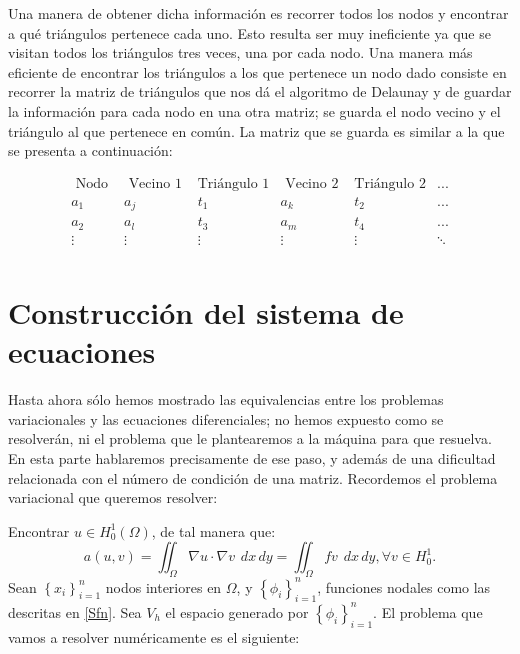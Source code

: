 \documentclass[12pt,spanish,oneside]{book}
\theoremstyle{plain}
\numberwithin{equation}{chapter}
\theoremstyle{definition}
\theoremstyle{remark}
\newcommand{\dxy}{\hspace{5pt} dx\hspace{2pt} dy }
\begin{document}
Una manera de obtener dicha información es recorrer todos los nodos y encontrar a qué triángulos pertenece cada uno. Esto resulta ser muy ineficiente ya que se visitan todos los triángulos tres veces, una por cada nodo. Una manera más eficiente de encontrar los triángulos a los que pertenece un nodo dado consiste en recorrer la matriz de triángulos que nos dá el algoritmo de Delaunay y de guardar la información para cada nodo en una otra matriz; se guarda el nodo vecino y el triángulo al que pertenece en común. La matriz que se guarda es similar a la que se presenta a continuación: 

\begin{equation*}
	\begin{array}{ccccccc}
		 \text{ Nodo } & \text{ Vecino 1 } & \text{Tri\'angulo 1}& \text{ Vecino 2 } & \text{Tri\'angulo 2} & ... \\
			a_1 & a_j & t_1 & a_k & t_2 & ...\\		
			a_2 & a_l & t_3 & a_m & t_4 & ...\\
			\vdots & \vdots &\vdots &\vdots &\vdots &\ddots \\

	\end{array}
\end{equation*}

\section{Construcción del sistema de ecuaciones}

Hasta ahora sólo hemos mostrado las equivalencias entre los problemas variacionales y las ecuaciones diferenciales; no hemos expuesto como se resolverán, ni el problema que le plantearemos a la máquina para que resuelva. En esta parte hablaremos precisamente de ese paso, y además de una dificultad relacionada con el número de condición de una matriz. 
Recordemos el problema variacional que queremos resolver:

Encontrar $u\in H_0^1(\Omega)$, de tal manera que:
\[a(u,v)=\iint_\Omega \nabla u\cdot \nabla v \dxy = \iint_\Omega f v\dxy, \forall v \in H_0^1. \]
Sean $\left\lbrace x_i\right\rbrace_{i=1}^n$ nodos interiores en $\Omega$, y $\left\lbrace \phi_i\right\rbrace_{i=1}^n$, funciones nodales como las descritas en \ref{Sfn}. Sea $V_h$ el espacio generado por $\left\lbrace \phi_i\right\rbrace_{i=1}^n$. El problema que vamos a resolver numéricamente es el siguiente: 
\end{document}
